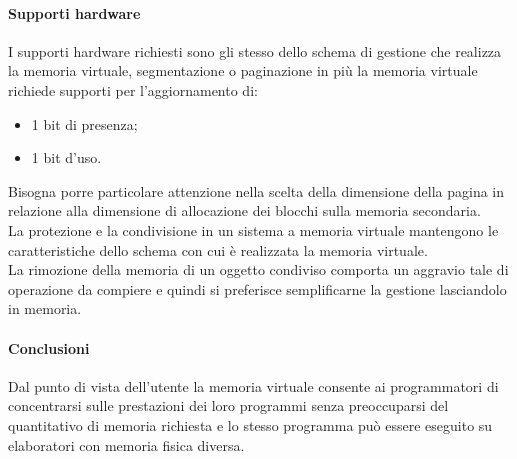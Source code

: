\documentclass[12pt, letterpaper]{report}
\begin{document}
	\paragraph{Supporti hardware} I supporti hardware richiesti sono gli stesso dello schema di gestione che realizza la memoria virtuale, segmentazione o paginazione in più la memoria virtuale richiede supporti per l'aggiornamento di:
	\begin{itemize}
		\item 1 bit di presenza;
		\item 1 bit d'uso.
	\end{itemize}
	Bisogna porre particolare attenzione nella scelta della dimensione della pagina in relazione alla dimensione di allocazione dei blocchi sulla memoria secondaria. \\
	La protezione e la condivisione in un sistema a memoria virtuale mantengono le caratteristiche dello schema con cui è realizzata la memoria virtuale. \\
	La rimozione della memoria di un oggetto condiviso comporta un aggravio tale di operazione da compiere e quindi si preferisce semplificarne la gestione lasciandolo in memoria.
	\paragraph{Conclusioni} Dal punto di vista dell'utente la memoria virtuale consente ai programmatori di concentrarsi sulle prestazioni dei loro programmi senza preoccuparsi del quantitativo di memoria richiesta e lo stesso programma può essere eseguito su elaboratori con memoria fisica diversa.
\end{document}
